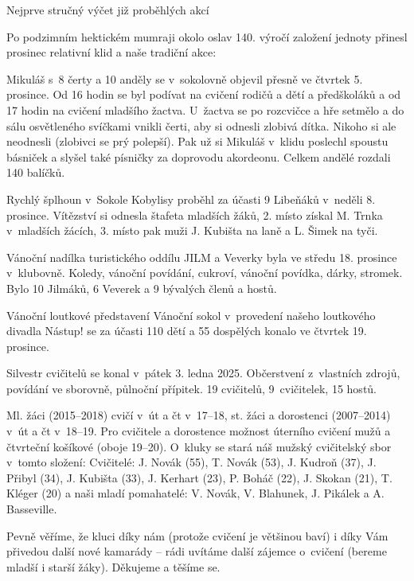 \documentclass[11pt]{article}
\begin{document}
\clearpage
\nopagecolor
\normalcolor

\restoregeometry
\pagestyle{standard}

Nejprve stručný výčet již proběhlých akcí

Po podzimním hektickém mumraji okolo oslav 140. výročí založení jednoty přinesl prosinec relativní klid a naše tradiční akce: 

Mikuláš s~8 čerty a 10 anděly se v~sokolovně objevil přesně ve čtvrtek 5. prosince. Od 16 hodin se byl podívat na cvičení rodičů a dětí a předškoláků a od 17 hodin na cvičení mladšího žactva. U~žactva se po rozcvičce a hře setmělo a do sálu osvětleného svíčkami vnikli čerti, aby si odnesli zlobivá dítka. Nikoho si ale neodnesli (zlobivci se prý polepší). Pak už si Mikuláš v~klidu poslechl spoustu básniček a slyšel také písničky za doprovodu akordeonu. Celkem andělé rozdali 140 balíčků.

Rychlý šplhoun v~Sokole Kobylisy proběhl za účasti 9 Libeňáků v~neděli 8. prosince. Vítězství si odnesla štafeta mladších žáků, 2. místo získal M. Trnka v~mladších žácích, 3. místo pak muži J. Kubišta na laně a L. Šimek na tyči. 

Vánoční nadílka turistického oddílu JILM a Veverky byla ve středu 18. prosince v~klubovně. Koledy, vánoční povídání, cukroví, vánoční povídka, dárky, stromek. Bylo 10 Jilmáků, 6 Veverek a 9 bývalých členů a hostů.

Vánoční loutkové představení Vánoční sokol v~provedení našeho loutkového divadla Nástup! se za účasti 110 dětí a 55 dospělých konalo ve čtvrtek 19. prosince.

Silvestr cvičitelů se konal v~pátek 3. ledna 2025. Občerstvení z~vlastních zdrojů, povídání ve sborovně, půlnoční přípitek. 19 cvičitelů, 9~cvičitelek, 15 hostů.

Ml. žáci (2015–2018) cvičí v~út a čt v~17–18, st. žáci a dorostenci (2007–2014) v~út a čt v~18–19. Pro cvičitele a dorostence možnost úterního cvičení mužů a čtvrteční košíkové (oboje 19–20). 
O~kluky se stará náš mužský cvičitelský sbor v~tomto složení:
Cvičitelé: J. Novák (55), T. Novák (53), J. Kudroň (37), J. Přibyl (34), J. Kubišta (33), J. Kerhart (23), P. Boháč (22), J. Skokan (21), T. Kléger (20) a naši mladí pomahatelé: V. Novák, V. Blahunek, J. Pikálek a A. Basseville. 

Pevně věříme, že kluci díky nám (protože cvičení je většinou baví) i díky Vám přivedou další nové kamarády – rádi uvítáme další zájemce o~cvičení (bereme mladší i starší žáky). Děkujeme a těšíme se. 
\end{document}
